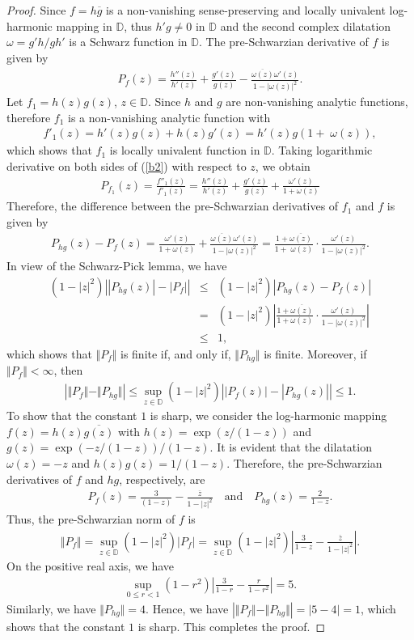 \documentclass[12pt,reqno]{amsart}
\newtheorem{open problem}{Open problem}[section]
\newcommand{\ol}{\overline}
\newcommand{\beas}{\begin{eqnarray*}}
\newcommand{\eeas}{\end{eqnarray*}}
\newcommand{\bea}{\begin{eqnarray}}
\newcommand{\eea}{\end{eqnarray}}
\numberwithin{equation}{section}
\begin{document}
\begin{proof}
Since $f=h\overline{g}$ is a non-vanishing sense-preserving and locally univalent log-harmonic mapping in $\mathbb{D}$, thus $h'g \neq 0$ in $\mathbb{D}$ and the second complex dilatation $\omega=g'h/gh'$ is a Schwarz function in $\mathbb{D}$. The pre-Schwarzian derivative of $f$ is given by
\bea\label{a2}
P_f(z)=\frac{h''(z)}{h'(z)}+\frac{g'(z)}{g(z)}-\frac{\overline{\omega(z)}\omega'(z)}{1-|\omega(z)|^2}.\eea
Let $f_1=h(z)g(z)$, $z\in\mathbb{D}$. Since $h$ and $g$ are non-vanishing analytic functions, therefore $f_1$ is a non-vanishing analytic function with 
\bea\label{b2} f'_1(z)=h'(z)g(z)+h(z)g'(z)=h'(z)g\left(1+\;\omega(z) \right),\eea
which shows that $f_1$ is locally univalent function in $\mathbb{D}$. Taking logarithmic derivative on both sides of (\ref{b2}) with respect to $z$, we obtain
\beas P_{f_1}(z)=\frac{f''_1(z)}{f'_1(z)}=\frac{h''(z)}{h'(z)}+\frac{g'(z)}{g(z)}+\frac{\omega'(z) }{1+\omega(z) }\eeas
Therefore, the difference between the pre-Schwarzian derivatives of $f_1$ and $f$ is given by
\bea\label{b4}
P_{hg}(z)-P_f(z)=\frac{\omega'(z) }{1+\omega(z) }+\frac{\overline{\omega(z)}\omega'(z)}{1-|\omega(z)|^2}=\frac{1+\ol{\omega(z)} }{1+\;\omega(z) }\cdot\frac{\omega'(z)}{1-|\omega(z)|^2}. \eea
In view of the Schwarz-Pick lemma, we have
\beas
(1-|z|^2)\left||P_{hg}(z)|-|P_f|\right|&\leq & (1-|z|^2)\left|P_{hg}(z)-P_f(z)\right| \\
&=&  (1-|z|^2)\left|\frac{1+\ol{\omega(z)}}{1+\omega(z) }\cdot\frac{\omega'(z)}{1-|\omega(z)|^2}\right|\\
&\leq &1,\eeas
which shows that $\Vert P_f\Vert$ is finite if, and only if, $\Vert P_{hg}\Vert$ is finite. Moreover, if $\Vert P_f\Vert<\infty$, then
\beas
\left|\Vert P_f\Vert-\Vert P_{hg}\Vert\right|\leq \sup_{z\in\mathbb{D}} (1-|z|^2)\left||P_f(z)|-|P_{hg}(z)|\right|\leq 1.\eeas
\indent To show that the constant $1$ is sharp, we consider the log-harmonic mapping $f(z)=h(z)\overline{g(z)}$ with $h(z)=\exp(z/(1-z))$ and $g(z)=\exp(-z/(1-z))/(1-z)$. It is evident that the dilatation $\omega(z)=-z$ and $h(z)g(z)=1/(1-z)$. 
Therefore, the pre-Schwarzian derivatives of $f$ and $hg$, respectively, are
\beas P_f(z)=\frac{3}{(1-z)}-\frac{\overline{z}}{1-|z|^2}\quad \text{and}\quad P_{hg}(z)=\frac{2}{1-z}.\eeas
Thus, the pre-Schwarzian norm of $f$ is
\beas
\Vert P_f\Vert=\sup_{z\in\mathbb{D}}(1-|z|^2)\left|P_f\right|=\sup_{z\in\mathbb{D}}(1-|z|^2)\left|\frac{3}{1-z}-\frac{\overline{z}}{1-|z|^2}\right|.
\eeas
On the positive real axis, we have
\beas \sup_{0\leq r<1} (1-r^2)\left|\frac{3}{1-r}-\frac{r}{1-r^2}\right|=5.\eeas
Similarly, we have $\Vert P_{hg}\Vert=4$. 
Hence, we have $\left|\Vert P_f \Vert -\Vert P_{hg}\Vert \right|=|5-4|=1$, which shows that the constant $1$ is sharp.
This completes the proof.
\end{proof}
\end{document}
